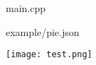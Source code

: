 \documentclass{article}
\begin{document}

    {main.cpp}

    {example/pie.json}


\begin{center}
\texttt{[image: test.png]}
\end{center}
\end{document}
